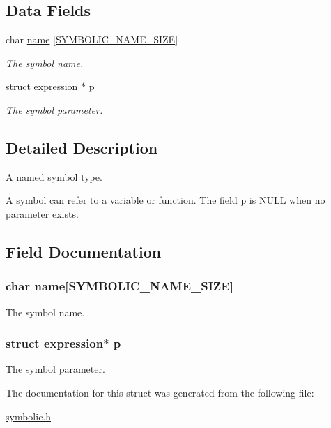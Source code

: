 \subsection*{Data Fields}
\begin{DoxyCompactItemize}
\item 
char \hyperlink{structsym_ab3675903eb67a0a887759b93892151a5}{name} \mbox{[}\hyperlink{symbolic_8h_aeb7545cf4c9c6df72954b9409a00a885}{S\+Y\+M\+B\+O\+L\+I\+C\+\_\+\+N\+A\+M\+E\+\_\+\+S\+I\+Z\+E}\mbox{]}
\begin{DoxyCompactList}\small\item\em The symbol name. \end{DoxyCompactList}\item 
struct \hyperlink{structexpression}{expression} $\ast$ \hyperlink{structsym_a0796b3f7efa6a72c76822710e20c6060}{p}
\begin{DoxyCompactList}\small\item\em The symbol parameter. \end{DoxyCompactList}\end{DoxyCompactItemize}


\subsection{Detailed Description}
A named symbol type. 

A symbol can refer to a variable or function. The field p is N\+U\+L\+L when no parameter exists. 

\subsection{Field Documentation}
\hypertarget{structsym_ab3675903eb67a0a887759b93892151a5}{
\subsubsection[{name}]{\setlength{\rightskip}{0pt plus 5cm}char name\mbox{[}{\bf S\+Y\+M\+B\+O\+L\+I\+C\+\_\+\+N\+A\+M\+E\+\_\+\+S\+I\+Z\+E}\mbox{]}}}\label{structsym_ab3675903eb67a0a887759b93892151a5}


The symbol name. 

\hypertarget{structsym_a0796b3f7efa6a72c76822710e20c6060}{
\subsubsection[{p}]{\setlength{\rightskip}{0pt plus 5cm}struct {\bf expression}$\ast$ p}}\label{structsym_a0796b3f7efa6a72c76822710e20c6060}


The symbol parameter. 



The documentation for this struct was generated from the following file\+:\begin{DoxyCompactItemize}
\item 
\hyperlink{symbolic_8h}{symbolic.\+h}\end{DoxyCompactItemize}
